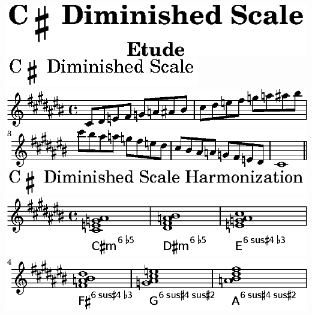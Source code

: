 \includegraphics{88/lily-44fe9253-1}%
\ifx\betweenLilyPondSystem \undefined
  \linebreak
\else
  \expandafter{}%
\fi
\includegraphics{88/lily-44fe9253-2}%
\ifx\betweenLilyPondSystem \undefined
  \linebreak
\else
  \expandafter{}%
\fi
\includegraphics{88/lily-44fe9253-3}%
\ifx\betweenLilyPondSystem \undefined
  \linebreak
\else
  \expandafter{}%
\fi
\includegraphics{88/lily-44fe9253-4}%
\ifx\betweenLilyPondSystem \undefined
  \linebreak
\else
  \expandafter{}%
\fi
\includegraphics{88/lily-44fe9253-5}%
\ifx\betweenLilyPondSystem \undefined
  \linebreak
\else
  \expandafter{}%
\fi
\includegraphics{88/lily-44fe9253-6}%
\ifx\betweenLilyPondSystem \undefined
  \linebreak
\else
  \expandafter{}%
\fi
\includegraphics{88/lily-44fe9253-7}%
